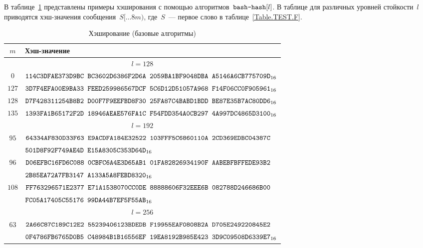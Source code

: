 \label{TEST.Hash}

В таблице~\ref{Table.TEST.Hash} представлены примеры хэширования
с помощью алгоритмов~$\texttt{bash-hash}[l]$.
%
В таблице для различных уровней стойкости~$l$ приводятся хэш-значения 
сообщения~$S[\dots 8m)$, где~$S$~--- первое слово в таблице~\ref{Table.TEST.F}.

\clearpage

\begin{table}[H]
\caption{Хэширование (базовые алгоритмы)}\label{Table.TEST.Hash}
\begin{tabular}{|c|l|}
\hline
$m$ & Хэш-значение\\
\hline
%
\hline
\multicolumn{2}{|c|}{$l=128$}\\
\hline
$0$ &
$\texttt{114C3DFAE373D9BC~BC3602D6386F2D6A~2059BA1BF9048DBA~A5146A6CB775709D}_{16}$\\
\hline
$127$ &
$\texttt{3D7F4EFA00E9BA33~FEED259986567DCF~5C6D12D51057A968~F14F06CC0F905961}_{16}$\\
\hline                                                        
$128$ &
$\texttt{D7F428311254B8B2~D00F7F9EEFBD8F30~25FA87C4BABD1BDD~BE87E35B7AC80DD6}_{16}$\\
\hline                                                        
$135$ &
$\texttt{1393FA1B65172F2D~18946AEAE576FA1C~F54FDD354A0CB297~4A997DC4865D3100}_{16}$\\
%
\hline
\hline
\multicolumn{2}{|c|}{$l=192$}\\
\hline
$95$ &
$\texttt{64334AF830D33F63~E9ACDFA184E32522~103FFF5C6860110A~2CD369EDBC04387C}$\\
&
$\texttt{501D8F92F749AE4D~E15A8305C353D64D}_{16}$\\
\hline
$96$ &
$\texttt{D06EFBC16FD6C088~0CBFC6A4E3D65AB1~01FA82826934190F~AABEBFBFFEDE93B2}$\\
&
$\texttt{2B85EA72A7FB3147~A133A5A8FEBD8320}_{16}$\\
\hline                                                        
$108$ &
$\texttt{FF763296571E2377~E71A1538070CC0DE~88888606F32EEE6B~082788D246686B00}$\\
&
$\texttt{FC05A17405C55176~99DA44B7EF5F55AB}_{16}$\\
%
\hline
\hline
\multicolumn{2}{|c|}{$l=256$}\\
\hline                                                        
$63$ &
$\texttt{2A66C87C189C12E2~55239406123BDEDB~F19955EAF0808B2A~D705E249220845E2}$\\
&
$\texttt{0F4786FB6765D0B5~C48984B1B16556EF~19EA8192B985E423~3D9C09508D6339E7}_{16}$\\

\end{tabular}
\end{table}
